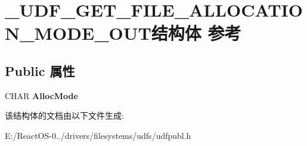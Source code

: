 \hypertarget{struct___u_d_f___g_e_t___f_i_l_e___a_l_l_o_c_a_t_i_o_n___m_o_d_e___o_u_t}{}\section{\+\_\+\+U\+D\+F\+\_\+\+G\+E\+T\+\_\+\+F\+I\+L\+E\+\_\+\+A\+L\+L\+O\+C\+A\+T\+I\+O\+N\+\_\+\+M\+O\+D\+E\+\_\+\+O\+U\+T结构体 参考}
\label{struct___u_d_f___g_e_t___f_i_l_e___a_l_l_o_c_a_t_i_o_n___m_o_d_e___o_u_t}
\subsection*{Public 属性}
\begin{DoxyCompactItemize}
\item 
\mbox{\label{struct___u_d_f___g_e_t___f_i_l_e___a_l_l_o_c_a_t_i_o_n___m_o_d_e___o_u_t_aa7810306a07fbaa460466f79762d892a}} 
C\+H\+AR {\bfseries Alloc\+Mode}
\end{DoxyCompactItemize}


该结构体的文档由以下文件生成\+:\begin{DoxyCompactItemize}
\item 
E\+:/\+React\+O\+S-\/0../drivers/filesystems/udfs/udfpubl.\+h\end{DoxyCompactItemize}
